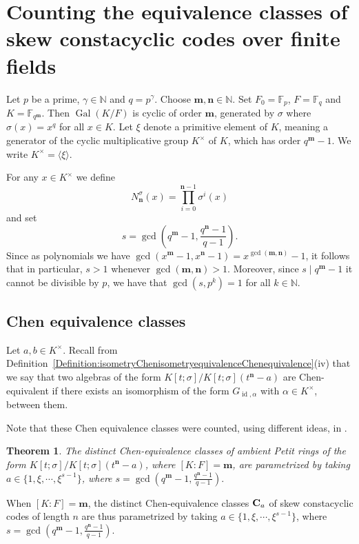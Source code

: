 \documentclass[11pt]{amsart}
\theoremstyle{plain}
\newtheorem{theorem}{Theorem}[section]
\theoremstyle{definition}
\numberwithin{equation}{section}
\numberwithin{figure}{section}
\newcommand{\NN}{\mathbb{N}}
\DeclareMathOperator{\id}{id}
\newcommand{\os}{{\mathbf{m}}}  %
\newcommand{\de}{{\mathbf{n}}}  %
\DeclareMathOperator{\Gal}{Gal}
\begin{document}
\section{Counting the equivalence classes of skew constacyclic codes over finite fields} \label{sec:countingequivclasses}


Let $p$ be a prime, $\gamma\in \NN$ and $q=p^\gamma$.  Choose $\os,\de\in \mathbb{N}$. Set  $F_0=\mathbb{F}_p$, $F=\mathbb{F}_q$ and $K=\mathbb{F}_{q^\os}$. Then $\Gal(K/F)$ is cyclic of order $\os$, generated by $\sigma$ where $\sigma(x)=x^q$ for all $x\in K$.  Let $\xi$ denote a primitive element of $K$, meaning a generator of the cyclic multiplicative group $K^\times$ of $K$, which has order $q^\os-1$. We write $K^\times =\langle \xi \rangle$.

For any $x\in K^\times$ we define
$$
N^\sigma_\de(x) = \prod_{i=0}^{\de-1}\sigma^i(x)
$$
and set
$$
s = \gcd\left(q^\os-1, \frac{q^\de-1}{q-1}\right).
$$
Since as polynomials we have $\gcd(x^\os-1,x^\de-1)=x^{\gcd(\os,\de)}-1$, it follows that in particular,  $s>1$ whenever $\gcd(\os,\de)>1$.  Moreover, since $s\mid q^\os-1$ it cannot be divisible by $p$, we have that $\gcd(s,p^k)=1$ for all $k\in \NN$.%


\subsection{Chen equivalence classes}
Let $a,b\in K^\times$.
Recall from Definition~\ref{Definition:isometryChenisometryequivalenceChenequivalence}(iv) that we say that two algebras of the form $K[t;\sigma]/K[t;\sigma](t^\de-a)$ are Chen-equivalent if there exists an isomorphism of the form $G_{\id,\alpha}$ with $\alpha \in K^\times$, between them. %

Note that these Chen equivalence classes were counted, using different ideas, in \cite{NevinsPumpluen2025submitted}.

\begin{theorem}\label{L:Chenclassesfinitefield}
    The distinct Chen-equivalence classes of  ambient Petit rings of the form  $K[t;\sigma]/K[t;\sigma](t^\de-a)$, where $[K:F]=\os$, are parametrized by taking $a\in \{1, \xi, \cdots, \xi^{s-1}\}$, where $s = \gcd\left(q^\os-1, \frac{q^\de-1}{q-1}\right).$
    \end{theorem}

When  $[K:F]=\os$, the distinct Chen-equivalence classes ${\bf C}_a$ of skew constacyclic codes of length $n$ are thus parametrized by taking $a\in \{1, \xi, \cdots, \xi^{s-1}\}$, where $s = \gcd\left(q^\os-1, \frac{q^\de-1}{q-1}\right).$
\end{document}
